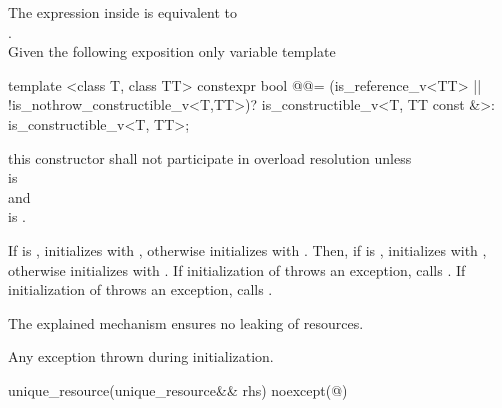 \documentclass[ebook,11pt,article]{memoir}
\begin{document}
\begin{itemdescr}
\pnum
\remarks
The expression inside  is equivalent to \\
 \tcode{\&\&} .\\
Given the following exposition only variable template
\begin{codeblock}
template <class T, class TT>
constexpr bool @@=
    (is_reference_v<TT> || !is_nothrow_constructible_v<T,TT>)?
    is_constructible_v<T, TT const &>:
    is_constructible_v<T, TT>;
\end{codeblock}
this constructor shall not participate in overload resolution unless
\\  is \\
and\\
 is .

\pnum
\effects 
If  is , initializes  with , otherwise initializes  with .
Then, if  is , initializes  with , otherwise initializes  with .
If initialization of  throws an exception, calls .  If initialization of  throws an exception, calls . 
\begin{note}
The explained mechanism ensures no leaking of resources.
\end{note}

\pnum
\throws Any exception thrown during initialization.
\end{itemdescr}


\begin{itemdecl}
unique_resource(unique_resource&& rhs) noexcept(@\seebelow@)
\end{itemdecl}
\end{document}
